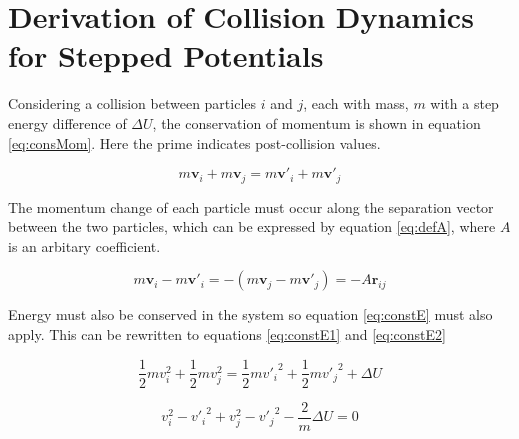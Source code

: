 \documentclass[12pt]{UoAthesis}
\begin{document}
\newpage\printbibliography[heading=thesisChapterBib] 

\appendix
\chapter{Derivation of Collision Dynamics for Stepped Potentials}
Considering a collision between particles $i$ and $j$, each with mass,
$m$ with a step energy difference of $\Delta U$, the conservation of
momentum is shown in equation \eqref{eq:consMom}. Here the prime
indicates post-collision values.

\begin{equation}
\label{eq:consMom}
m\mathbf{v}_i + m\mathbf{v}_j = m\mathbf{v}'_i + m\mathbf{v}'_j
\end{equation}

The momentum change of each particle must occur along the separation
vector between the two particles, which can be expressed by equation
\eqref{eq:defA}, where $A$ is an arbitary coefficient.

\begin{equation}
  \label{eq:defA}
  m\mathbf{v}_i - m\mathbf{v}'_i = -(m\mathbf{v}_j - m\mathbf{v}'_j) 
  = -A\mathbf{\hat{r}}_{ij}
\end{equation}

Energy must also be conserved in the system so equation
\eqref{eq:constE} must also apply.  This can be rewritten to equations
\eqref{eq:constE1} and \eqref{eq:constE2}

\begin{equation}
  \label{eq:constE}
  \frac{1}{2}mv_i^2 + \frac{1}{2}mv_j^2 =
  \frac{1}{2}m{v'_i}^2 + \frac{1}{2}m{v'_j}^2 + \Delta U
\end{equation}

\begin{equation}
  \label{eq:constE1}
  v_i^2 - {v'_i}^2 +
  v_j^2 - {v'_j}^2 - \frac{2}{m}\Delta U = 0
\end{equation}
\end{document}
